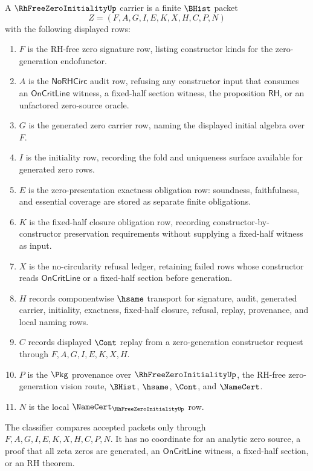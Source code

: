 \begin{definition}
\label{def:rh-free-zero-initiality-namecert}
A $\RhFreeZeroInitialityUp$ carrier is a finite $\BHist$ packet
$$
Z=(F,A,G,I,E,K,X,H,C,P,N)
$$
with the following displayed rows:
\begin{enumerate}
\item $F$ is the RH-free zero signature row, listing constructor kinds for the zero-generation endofunctor.
\item $A$ is the $\mathsf{NoRHCirc}$ audit row, refusing any constructor input that consumes an $\mathsf{OnCritLine}$ witness, a fixed-half section witness, the proposition $\mathsf{RH}$, or an unfactored zero-source oracle.
\item $G$ is the generated zero carrier row, naming the displayed initial algebra over $F$.
\item $I$ is the initiality row, recording the fold and uniqueness surface available for generated zero rows.
\item $E$ is the zero-presentation exactness obligation row: soundness, faithfulness, and essential coverage are stored as separate finite obligations.
\item $K$ is the fixed-half closure obligation row, recording constructor-by-constructor preservation requirements without supplying a fixed-half witness as input.
\item $X$ is the no-circularity refusal ledger, retaining failed rows whose constructor reads $\mathsf{OnCritLine}$ or a fixed-half section before generation.
\item $H$ records componentwise $\hsame$ transport for signature, audit, generated carrier, initiality, exactness, fixed-half closure, refusal, replay, provenance, and local naming rows.
\item $C$ records displayed $\Cont$ replay from a zero-generation constructor request through $F,A,G,I,E,K,X,H$.
\item $P$ is the $\Pkg$ provenance over $\RhFreeZeroInitialityUp$, the RH-free zero-generation vision route, $\BHist$, $\hsame$, $\Cont$, and $\NameCert$.
\item $N$ is the local $\NameCert_{\RhFreeZeroInitialityUp}$ row.
\end{enumerate}
The classifier compares accepted packets only through $F,A,G,I,E,K,X,H,C,P,N$. It has no coordinate for an analytic zero source, a proof that all zeta zeros are generated, an $\mathsf{OnCritLine}$ witness, a fixed-half section, or an RH theorem.
\end{definition}

